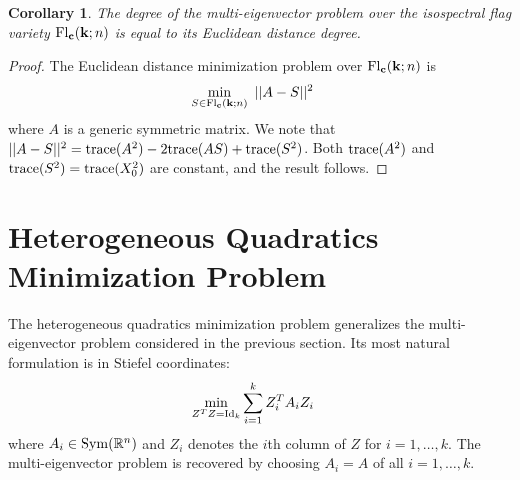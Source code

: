 \documentclass[12pt]{extarticle}
\newtheorem{corollary}[theorem]{Corollary}
\theoremstyle{definition}
\numberwithin{theorem}{section}
\newcommand{\RR}{\mathbb{R}}
\begin{document}
\begin{corollary} The degree of the multi-eigenvector problem 
over the isospectral flag variety ${\rm Fl}_{\bf c}({\bf k};n)$ is equal to its Euclidean distance degree.
\end{corollary}
\begin{proof} The Euclidean distance minimization problem over 
${\rm Fl}_{\bf c}({\bf k};n)$ is
\begin{align} 
 \min_{S \in {\rm Fl}_{\bf c}({\bf k}; n)} & \, \, \, || A - S ||^2
\end{align}
where $A$ is a generic symmetric matrix. We note that 
$|| A - S||^2 = {\rm trace}(A^2) - 2  {\rm trace}(AS) + {\rm trace}(S^2)$. Both ${\rm trace}(A^2)$ and ${\rm trace}(S^2) = {\rm trace}(X_0^2)$ are constant, and the result follows. 
\end{proof}

\section{Heterogeneous Quadratics Minimization Problem}\label{sec:heterogeneous}
The heterogeneous quadratics minimization problem generalizes the multi-eigenvector problem considered in the previous section. Its most natural formulation is in Stiefel coordinates:
\begin{align} \label{heterogeneous}
 \min_{Z^TZ = {\rm Id}_k} &\sum_{i=1}^k Z_i^T A_i Z_i
\end{align}
where $A_i \in {\rm Sym}(\RR^n)$ and $Z_i$ denotes the $i$th column of $Z$ for $i = 1, \ldots, k$. The multi-eigenvector problem is recovered by choosing $A_i=A$ of all $i=1, \ldots, k$. 
\end{document}
